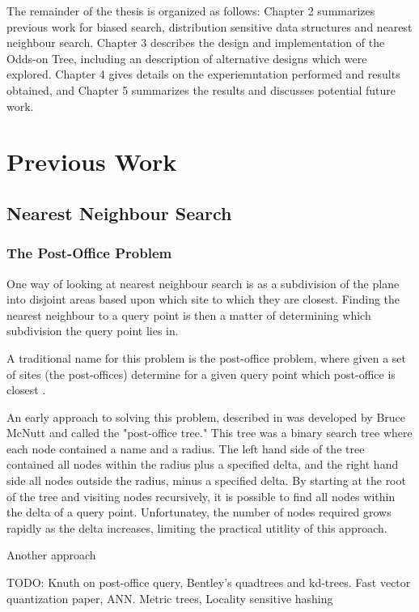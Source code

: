 \documentclass[mcs]{scsthesis}
\begin{document}
The remainder of the thesis is organized as follows: Chapter 2 summarizes
previous work for biased search, distribution sensitive data structures and
nearest neighbour search.  Chapter 3 describes the design and implementation of
the Odds-on Tree, including an description of alternative designs which were
explored.  Chapter 4 gives details on the experiemntation performed and results
obtained, and Chapter 5 summarizes the results and discusses potential 
future work.

\chapter{Previous Work}

\section{Nearest Neighbour Search}


\subsection{The Post-Office Problem}

One way of looking at nearest neighbour search is as a subdivision of the plane
into disjoint areas based upon which site to which they are closest. Finding
the nearest neighbour to a query point is then a matter of determining which
subdivision the query point lies in.

A traditional name for this problem is the post-office problem, where given a
set of sites (the post-offices) determine for a given query point which
post-office is closest \cite{dutch}.

An early approach to solving this problem, described in \cite{knuth} was
developed by Bruce McNutt and called the "post-office tree." This tree was
a binary search tree where each node contained a name and a radius. The left
hand side of the tree contained all nodes within the radius plus a
specified delta, and the right hand side all nodes outside the radius, minus
a specified delta. By starting at the root of the tree and visiting nodes
recursively, it is possible to find all nodes within the delta of a query
point. Unfortunatey, the number of nodes required grows rapidly as the delta
increases, limiting the practical utitlity of this approach. 

Another approach

TODO: Knuth on post-office query, Bentley's quadtrees and kd-trees.  Fast
vector quantization paper, ANN.  Metric trees, Locality sensitive hashing
\end{document}
